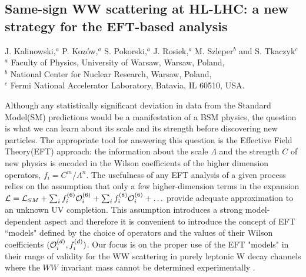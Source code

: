 \documentclass[../report.tex]{subfiles}
\begin{document}
\subsection{ Same-sign WW scattering at HL-LHC: a new strategy for the EFT-based analysis}
% 
\label{sect-ssWW}
\begin{center}
 {J. Kalinowski,$^{a} $
P. Koz{\'o}w,$^a$ S. Pokorski,$^a$
J. Rosiek,$^a$ M. Szleper$^b$ 
and
S. Tkaczyk$^c$\\
}
 {\small $^a$ Faculty of Physics, University of Warsaw, Warsaw,  Poland, \\
$^b$ National Center for Nuclear Research,  Warsaw, Poland, \\
$^c$  Fermi National Accelerator Laboratory, Batavia, IL 60510, USA.}
\end{center}
Although any statistically significant deviation in data from the  Standard Model(SM) predictions would be a manifestation of a BSM physics, the question is what we can learn about its scale and its strength before discovering new particles. The appropriate tool for answering this question is the Effective Field Theory(EFT) approach: the information about the  scale $\Lambda$ and the strength $C$ of new physics is encoded in  the Wilson coefficients of the higher dimension operators, $f_i=C^m/\Lambda^n$.
The usefulness of any EFT analysis of a given process relies on the assumption that only a few higher-dimension terms 
in the expansion ${\cal L}={\cal L}_{SM}+\sum_i f_i^{(6)}{\cal O}_i^{(6)}+ \sum_i f_i^{(8)}{\cal O}_i^{(6)}+\ldots$ 
provide adequate approximation to an unknown UV completion.   
This assumption  introduces a strong model-dependent aspect and therefore it is convenient to introduce the concept of EFT ``models" defined by the choice of operators  and the values of their Wilson coefficients $({\cal O}_i^{(d)},f_i^{(d)})$.  Our focus is on the proper use of the EFT "models" in their range of validity for the WW scattering in purely leptonic W decay channels where the $WW$ invariant mass cannot be determined experimentally  \cite{Kalinowski:2018oxd}.
\end{document}
